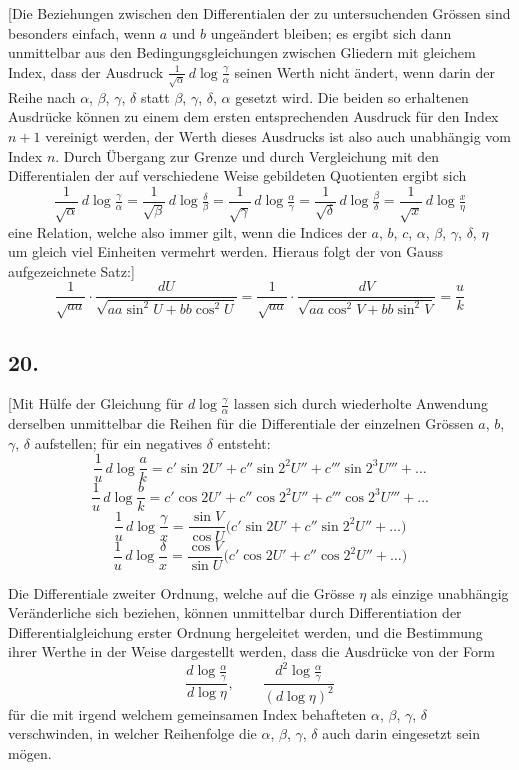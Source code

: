 \documentclass[10pt,a4paper]{article}
\begin{document}
[Die Beziehungen zwischen den Differentialen der zu untersuchenden Gr\"ossen
sind besonders einfach, wenn $a$ und $b$ unge\"andert bleiben; es ergibt sich
dann unmittelbar aus den Bedingungsgleichungen zwischen Gliedern mit gleichem
Index, dass der Ausdruck $\tfrac{1}{\sqrt{\alpha}}\,d\log\tfrac{\gamma}{\alpha}$
seinen Werth nicht \"andert, wenn darin der Reihe nach $\alpha$, $\beta$,
$\gamma$, $\delta$ statt $\beta$, $\gamma$, $\delta$, $\alpha$ gesetzt wird.
Die beiden so erhaltenen Ausdr\"ucke k\"onnen zu einem dem ersten entsprechenden
Ausdruck f\"ur den Index $n+1$ vereinigt werden, der Werth dieses Ausdrucks
ist also auch unabh\"angig vom Index $n$. Durch \"Ubergang zur Grenze und
durch Vergleichung mit den Differentialen der auf verschiedene Weise
gebildeten Quotienten ergibt sich
\[
\frac{1}{\sqrt{\alpha}}\,d\log\tfrac{\gamma}{\alpha}
 = \frac{1}{\sqrt{\beta}}\,d\log\tfrac{\delta}{\beta}
 = \frac{1}{\sqrt{\gamma}}\,d\log\tfrac{\alpha}{\gamma}
 = \frac{1}{\sqrt{\delta}}\,d\log\tfrac{\beta}{\delta}
 = \frac{1}{\sqrt{x}}\,d\log\tfrac{x}{\eta}
\]
eine Relation, welche also immer gilt, wenn die Indices der
$a$, $b$, $c$, $\alpha$, $\beta$, $\gamma$, $\delta$, $\eta$ um gleich viel
Einheiten vermehrt werden. Hieraus folgt der von Gauss aufgezeichnete Satz:]
\[
\frac{1}{\sqrt{aa}}\cdot\frac{dU}{\sqrt{aa\sin^2 U + bb\cos^2 U}}
 = \frac{1}{\sqrt{aa}}\cdot\frac{dV}{\sqrt{aa\cos^2 V + bb\sin^2 V}}
 = \frac{u}{k}
\]


\subsection*{20.}

[Mit H\"ulfe der Gleichung f\"ur $d\log\tfrac{\gamma}{\alpha}$ lassen sich
durch wiederholte Anwendung derselben unmittelbar die Reihen f\"ur die
Differentiale der einzelnen Gr\"ossen $a$, $b$, $\gamma$, $\delta$ aufstellen;
f\"ur ein negatives $\delta$ entsteht:
\[
\frac{1}{u}\,d\log\frac{a}{k}
 = c'\sin 2U' + c''\sin 2^2 U'' + c'''\sin 2^3 U''' + \ldots
\]
\[
\frac{1}{u}\,d\log\frac{b}{k}
 = c'\cos 2U' + c''\cos 2^2 U'' + c'''\cos 2^3 U''' + \ldots
\]
\[
\frac{1}{u}\,d\log\frac{\gamma}{x}
 = \frac{\sin V}{\cos U}\bigl(c'\sin 2U' + c''\sin 2^2 U'' + \ldots\bigr)
\]
\[
\frac{1}{u}\,d\log\frac{\delta}{x}
 = \frac{\cos V}{\sin U}\bigl(c'\cos 2U' + c''\cos 2^2 U'' + \ldots\bigr)
\]

Die Differentiale zweiter Ordnung, welche auf die Gr\"osse $\eta$ als einzige
unabh\"angig Ver\"anderliche sich beziehen, k\"onnen unmittelbar durch
Differentiation der Differentialgleichung erster Ordnung hergeleitet werden,
und die Bestimmung ihrer Werthe in der Weise dargestellt werden, dass die
Ausdr\"ucke von der Form
\[
\frac{d\log\tfrac{\alpha}{\gamma}}{d\log\eta}, \qquad
\frac{d^2\log\tfrac{\alpha}{\gamma}}{(d\log\eta)^2}
\]
f\"ur die mit irgend welchem gemeinsamen Index behafteten $\alpha$, $\beta$,
$\gamma$, $\delta$ verschwinden, in welcher Reihenfolge die $\alpha$, $\beta$,
$\gamma$, $\delta$ auch darin eingesetzt sein m\"ogen.
\end{document}
